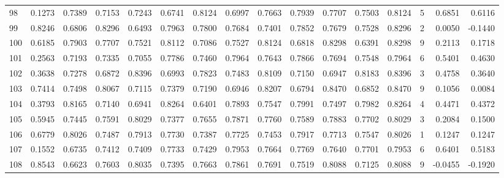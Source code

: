 \begin{tabular}{lrrrrrrrrrrrrrrr}
98  &      0.1273 &  0.7389 &  0.7153 &  0.7243 &  0.6741 &  0.8124 &  0.6997 &  0.7663 &  0.7939 &  0.7707 &   0.7503 &     0.8124 &      5 &                    0.6851 &                     0.6116 \\
99  &      0.8246 &  0.6806 &  0.8296 &  0.6493 &  0.7963 &  0.7800 &  0.7684 &  0.7401 &  0.7852 &  0.7679 &   0.7528 &     0.8296 &      2 &                    0.0050 &                    -0.1440 \\
100 &      0.6185 &  0.7903 &  0.7707 &  0.7521 &  0.8112 &  0.7086 &  0.7527 &  0.8124 &  0.6818 &  0.8298 &   0.6391 &     0.8298 &      9 &                    0.2113 &                     0.1718 \\
101 &      0.2563 &  0.7193 &  0.7335 &  0.7055 &  0.7786 &  0.7460 &  0.7964 &  0.7643 &  0.7866 &  0.7694 &   0.7548 &     0.7964 &      6 &                    0.5401 &                     0.4630 \\
102 &      0.3638 &  0.7278 &  0.6872 &  0.8396 &  0.6993 &  0.7823 &  0.7483 &  0.8109 &  0.7150 &  0.6947 &   0.8183 &     0.8396 &      3 &                    0.4758 &                     0.3640 \\
103 &      0.7414 &  0.7498 &  0.8067 &  0.7115 &  0.7379 &  0.7190 &  0.6946 &  0.8207 &  0.6794 &  0.8470 &   0.6852 &     0.8470 &      9 &                    0.1056 &                     0.0084 \\
104 &      0.3793 &  0.8165 &  0.7140 &  0.6941 &  0.8264 &  0.6401 &  0.7893 &  0.7547 &  0.7991 &  0.7497 &   0.7982 &     0.8264 &      4 &                    0.4471 &                     0.4372 \\
105 &      0.5945 &  0.7445 &  0.7591 &  0.8029 &  0.7377 &  0.7655 &  0.7871 &  0.7760 &  0.7589 &  0.7883 &   0.7702 &     0.8029 &      3 &                    0.2084 &                     0.1500 \\
106 &      0.6779 &  0.8026 &  0.7487 &  0.7913 &  0.7730 &  0.7387 &  0.7725 &  0.7453 &  0.7917 &  0.7713 &   0.7547 &     0.8026 &      1 &                    0.1247 &                     0.1247 \\
107 &      0.1552 &  0.6735 &  0.7412 &  0.7409 &  0.7733 &  0.7429 &  0.7953 &  0.7664 &  0.7769 &  0.7640 &   0.7701 &     0.7953 &      6 &                    0.6401 &                     0.5183 \\
108 &      0.8543 &  0.6623 &  0.7603 &  0.8035 &  0.7395 &  0.7663 &  0.7861 &  0.7691 &  0.7519 &  0.8088 &   0.7125 &     0.8088 &      9 &                   -0.0455 &                    -0.1920 \\

\end{tabular}
